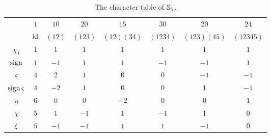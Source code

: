 \begin{table}[h]
    \caption{The character table of $\mathbb{S}_5$.}
    \begin{tabular}{|c|ccccccc|}
        \hline 
        & $1$ & $10$ & $20$ & $15$ & $30$ & $20$ & $24$ \\
        & $\operatorname{id}$ & $(12)$ & $(123)$ & $(12)(34)$ & $(1234)$ & $(123)(45)$  & $(12345)$ \\
        \hline 
        $\chi_1$ & $1$ & $1$ & $1$ & $1$ & $1$ & $1$ & $1$ \\
        $\operatorname{sign}$ & $1$ & $-1$ & $1$ & $1$ & $-1$ & $-1$ & $1$ \\
        $\varsigma$ & $4$ & $2$ & $1$ & $0$ & $0$ & $-1$ & $-1$ \\
        $\operatorname{sign}\varsigma$ & $4$ & $-2$ & $1$ & $0$ & $0$ & $1$ & $-1$ \\
        $\eta$ & $6$ & $0$ & $0$ & $-2$ & $0$ & $0$ & $1$ \\
        $\chi$ & $5$ & $1$ & $-1$ & $1$ & $-1$ & $1$ & $0$ \\
        $\xi$ & $5$ & $-1$ & $-1$ & $1$ & $1$ & $-1$ & $0$ \\
        \hline 
    \end{tabular}
    \end{table}


